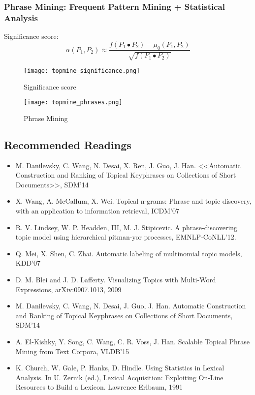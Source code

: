 \subsubsection{Phrase Mining: Frequent Pattern Mining + Statistical Analysis}

Significance score:
\begin{equation*}
\alpha(P_1, P_2) \approx \frac{f(P_1 \bullet P_2) - \mu_0(P_1, P_2)}{\sqrt{f(P_1 \bullet P_2)}}
\end{equation*}

\begin{figure}[H]
    \centering
    \texttt{[image: topmine\_significance.png]}
    \caption{Significance score}
\end{figure}

\begin{figure}[H]
    \centering
    \texttt{[image: topmine\_phrases.png]}
    \caption{Phrase Mining}
\end{figure}

\subsection{Recommended Readings}
\begin{itemize}
\item M. Danilevsky, C. Wang, N. Desai, X. Ren, J. Guo, J. Han. <<Automatic Construction and Ranking of Topical Keyphrases on Collections of Short Documents>>, SDM’14
\item X. Wang, A. McCallum, X. Wei. Topical n-grams: Phrase and topic discovery, with an application to information retrieval, ICDM’07
\item R. V. Lindsey, W. P. Headden, III, M. J. Stipicevic. A phrase-discovering topic model using hierarchical pitman-yor processes, EMNLP-CoNLL’12.
\item Q. Mei, X. Shen, C. Zhai. Automatic labeling of multinomial topic models, KDD’07
\item D. M. Blei and J. D. Lafferty. Visualizing Topics with Multi-Word Expressions, arXiv:0907.1013, 2009
\item M. Danilevsky, C. Wang, N. Desai, J. Guo, J. Han. Automatic Construction and Ranking of Topical Keyphrases on Collections of Short Documents, SDM’14
\item A. El-Kishky, Y. Song, C. Wang, C. R. Voss, J. Han. Scalable Topical Phrase Mining from Text Corpora, VLDB'15
\item K. Church, W. Gale, P. Hanks, D. Hindle. Using Statistics in Lexical Analysis. In U. Zernik (ed.), Lexical Acquisition: Exploiting On-Line Resources to Build a Lexicon. Lawrence Erlbaum, 1991
\end{itemize}

